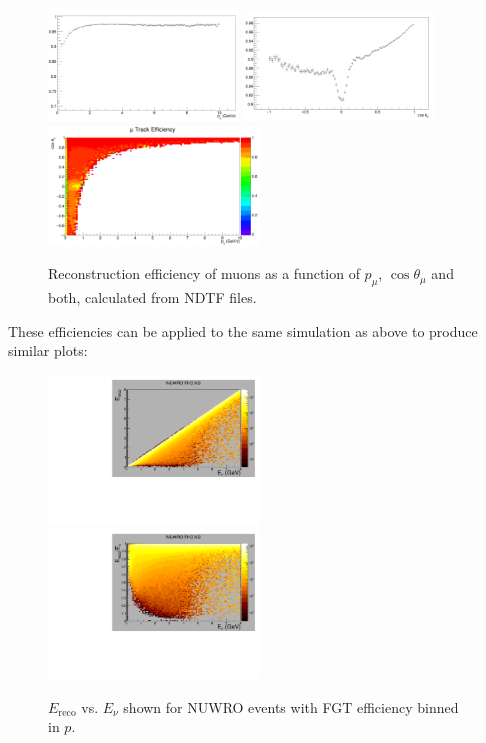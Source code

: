 \documentclass{article}
\begin{document}
\begin{figure}
  \begin{center}
    \includegraphics[width=0.45\textwidth]{plots.old/fig15.png}
    \includegraphics[width=0.45\textwidth]{plots.old/fig16.png}
    \includegraphics[width=0.5\textwidth]{plots.old/fig17.png}
    \caption{Reconstruction efficiency of muons as a function of $p_\mu$, $\cos \theta_\mu$ and both, calculated from NDTF files.}
  \end{center}
\end{figure}

These efficiencies can be applied to the same simulation as above to produce similar plots:

\begin{figure}[!h]
  \includegraphics[width=0.5\textwidth]{plots.old/fig18.pdf}
  \includegraphics[width=0.5\textwidth]{plots.old/fig19.pdf}
  \caption{$E_{\mathrm{reco}}$ vs. $E_\nu$ shown for NUWRO events with FGT efficiency binned in $p$.}
\end{figure}
\end{document}
